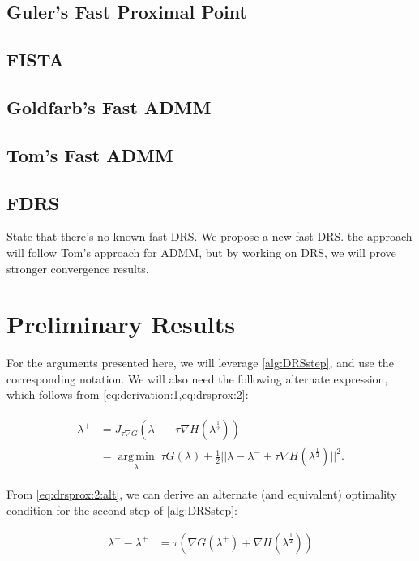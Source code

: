 \documentclass[11pt]{article}
\newcommand{\half}{^{\frac 12}}
\newcommand{\plus}{^+}
\newcommand{\minus}{^-}
\newcommand{\argmin}[1]{\underset{#1}{\operatorname{arg\,min}}\;}
\def\grad {{\nabla}}
\begin{document}
\subsection{Guler's Fast Proximal Point}
\subsection{FISTA}
\subsection{Goldfarb's Fast ADMM}
\subsection{Tom's Fast ADMM}
\subsection{FDRS}
State that there's no known fast DRS.  We propose a new fast DRS.  the approach will follow Tom's approach for ADMM, but by working on DRS, we will prove stronger convergence results.


\section{Preliminary Results}

For the arguments presented here, we will leverage \cref{alg:DRSstep},
and use the corresponding notation.  We will also need the following
alternate expression, which follows from
\cref{eq:derivation:1,eq:drsprox:2}:

\begin{align}
\begin{split}
\lambda\plus &= J_{\tau\grad G}(\lambda\minus - \tau\grad H(\lambda\half)) \\
&= \argmin{\lambda} \tau G(\lambda) + \frac 12||\lambda - \lambda\minus + \tau \grad H(\lambda\half)||^2.  \label{eq:drsprox:2:alt} 
\end{split}
\end{align}

\noindent From \cref{eq:drsprox:2:alt}, we can derive an alternate (and equivalent) optimality condition for the second step of \cref{alg:DRSstep}:

\begin{align}
\lambda\minus - \lambda\plus &= \tau (\grad G(\lambda\plus) + \grad H(\lambda\half)) \label{opt:drs:2:alt}
\end{align}
\end{document}
